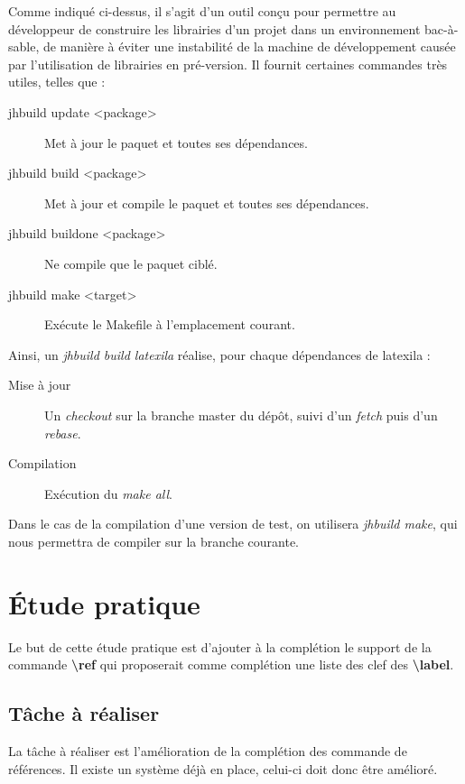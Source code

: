 \documentclass[a4paper,11pt]{report}
\begin{document}
Comme indiqué ci-dessus, il s'agit d'un outil conçu pour permettre au développeur de construire les librairies d'un projet dans un environnement bac-à-sable, de manière à éviter une instabilité de la machine de développement causée par l'utilisation de librairies en pré-version.
Il fournit certaines commandes très utiles, telles que :

\begin{description}
  \item[jhbuild update <package>] Met à jour le paquet et toutes ses dépendances.
  \item[jhbuild build <package>] Met à jour et compile le paquet et toutes ses dépendances.
  \item[jhbuild buildone <package>] Ne compile que le paquet ciblé.
  \item[jhbuild make <target>] Exécute le Makefile à l'emplacement courant.
\end{description}

Ainsi, un \textit{jhbuild build latexila} réalise, pour chaque dépendances de latexila :

\begin{description} 
  \item[Mise à jour] Un \textit{checkout} sur la branche master du dépôt, suivi d'un \textit{fetch} puis d'un \textit{rebase}.
  \item[Compilation] Exécution du \textit{make all}.
\end{description}

Dans le cas de la compilation d'une version de test, on utilisera \textit{jhbuild make}, qui nous permettra de compiler sur la branche courante.

\chapter{Étude pratique} %
\label{cha:etude_pratique}
Le but de cette étude pratique est d'ajouter à la complétion le support de la commande \textbf{\textbackslash{}ref} qui proposerait comme complétion une liste des clef des \textbf{\textbackslash{}label}.

\section{Tâche à réaliser} %
\label{sec:tache_a_realiser}
La tâche à réaliser est l'amélioration de la complétion des commande de références. Il existe un système déjà en place, celui-ci doit donc être amélioré.
\end{document}
